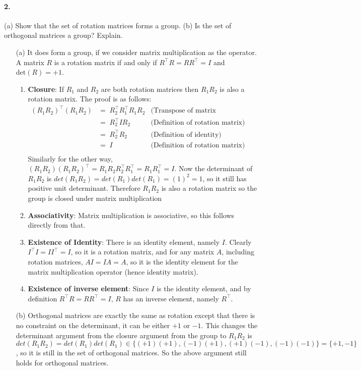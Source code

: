 \documentclass[english]{article}
\begin{document}
\paragraph{2.}

(a) Show that the set of rotation matrices forms a group. (b) Is the set of orthogonal matrices a group? Explain. 
\begin{enumerate}
\item[(a)] It does form a group, if we consider matrix multiplication as the operator. A matrix $R$ is a rotation matrix if and only if $R^\top R = R R^\top = I$ and $\mathrm{det}(R) = +1$.
	\begin{enumerate}
	\item \textbf{Closure}: If $R_1$ and $R_2$ are both rotation matrices then $R_1 R_2$ is also a rotation matrix. The proof is as follows:
		\begin{align*}
			(R_1 R_2)^\top (R_1 R_2)
					&=\; R_2^\top R_1^\top R_1 R_2 & \textrm{(Transpose of matrix multiplication)} \\
					&=\; R_2^\top I R_2 & \textrm{(Definition of rotation matrix)} \\
					&=\; R_2^\top R_2 & \textrm{(Definition of identity)} \\
					&=\; I & \textrm{(Definition of rotation matrix)} \\
		\end{align*}
		Similarly for the other way, $ (R_1 R_2) (R_1 R_2)^\top = R_1 R_2 R_2^\top R_1^\top = R_1 R_1^\top = I$. Now the determinant of $R_1 R_2$ is $det(R_1 R_2) = det(R_1) det(R_1) = (1)^2 = 1$, so it still has positive unit determinant.
		Therefore $R_1 R_2$ is also a rotation matrix so the group is closed under matrix multiplication
	\item \textbf{Associativity}: Matrix multiplication is associative, so this follows directly from that.
	\item \textbf{Existence of Identity}: There is an identity element, namely $I$. Clearly $I^\top I = I I^\top = I$, so it is a rotation matrix, and for any matrix $A$, including rotation matrices, $A I = I A = A$, so it is the identity element for the matrix multiplication operator (hence identity matrix).
	\item \textbf{Existence of inverse element}: Since $I$ is the identity element, and by definition $R^\top R = R R^\top = I$, $R$ has an inverse element, namely $R^\top$.
	\end{enumerate}
\item[(b)] Orthogonal matrices are exactly the same as rotation except that there is no constraint on the determinant, it can be either $+1$ or $-1$. This changes the determinant argument from the closure argument from the group to $R_1 R_2$ is $det(R_1 R_2) = det(R_1) det(R_1) \in \{(+1)(+1), (-1)(+1), (+1)(-1), (-1)(-1)\} = \{+1,-1\}$, so it is still in the set of orthogonal matrices. So the above argument still holds for orthogonal matrices. 
 
\end{enumerate}
\end{document}
